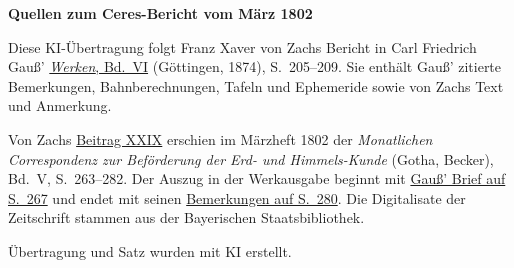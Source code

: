 \clearpage\thispagestyle{empty}
\begin{center}\textbf{Quellen zum Ceres-Bericht vom März 1802}\end{center}
\noindent Diese KI-Übertragung folgt Franz Xaver von Zachs Bericht in Carl Friedrich Gauß’ \href{https://gdz.sub.uni-goettingen.de/id/PPN236007467}{\textit{Werken}, Bd.~VI} (Göttingen, 1874), S.~205--209. Sie enthält Gauß’ zitierte Bemerkungen, Bahnberechnungen, Tafeln und Ephemeride sowie von Zachs Text und Anmerkung.
\par\smallskip\noindent Von Zachs \href{https://api.digitale-sammlungen.de/iiif/image/v2/bsb10538597_00273/full/1450,/0/default.jpg}{Beitrag XXIX} erschien im Märzheft 1802 der \textit{Monatlichen Correspondenz zur Beförderung der Erd- und Himmels-Kunde} (Gotha, Becker), Bd.~V, S.~263--282. Der Auszug in der Werkausgabe beginnt mit \href{https://api.digitale-sammlungen.de/iiif/image/v2/bsb10538597_00277/full/1450,/0/default.jpg}{Gauß’ Brief auf S.~267} und endet mit seinen \href{https://api.digitale-sammlungen.de/iiif/image/v2/bsb10538597_00290/full/1450,/0/default.jpg}{Bemerkungen auf S.~280}. Die Digitalisate der Zeitschrift stammen aus der Bayerischen Staatsbibliothek.
\par\smallskip\noindent Übertragung und Satz wurden mit KI erstellt.
\clearpage
